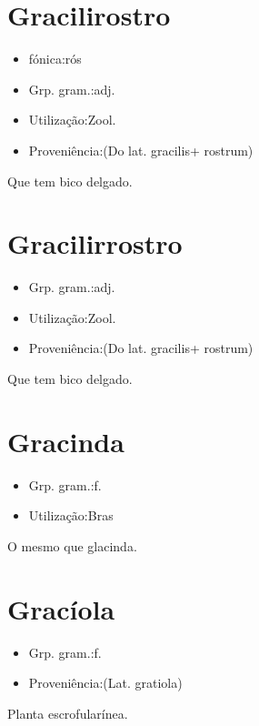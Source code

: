 \section{Gracilirostro}
\begin{itemize}
\item {fónica:rós}
\end{itemize}
\begin{itemize}
\item {Grp. gram.:adj.}
\end{itemize}
\begin{itemize}
\item {Utilização:Zool.}
\end{itemize}
\begin{itemize}
\item {Proveniência:(Do lat. \textunderscore gracilis\textunderscore  + \textunderscore rostrum\textunderscore )}
\end{itemize}
Que tem bico delgado.
\section{Gracilirrostro}
\begin{itemize}
\item {Grp. gram.:adj.}
\end{itemize}
\begin{itemize}
\item {Utilização:Zool.}
\end{itemize}
\begin{itemize}
\item {Proveniência:(Do lat. \textunderscore gracilis\textunderscore  + \textunderscore rostrum\textunderscore )}
\end{itemize}
Que tem bico delgado.
\section{Gracinda}
\begin{itemize}
\item {Grp. gram.:f.}
\end{itemize}
\begin{itemize}
\item {Utilização:Bras}
\end{itemize}
O mesmo que \textunderscore glacinda\textunderscore .
\section{Gracíola}
\begin{itemize}
\item {Grp. gram.:f.}
\end{itemize}
\begin{itemize}
\item {Proveniência:(Lat. \textunderscore gratiola\textunderscore )}
\end{itemize}
Planta escrofularínea.
